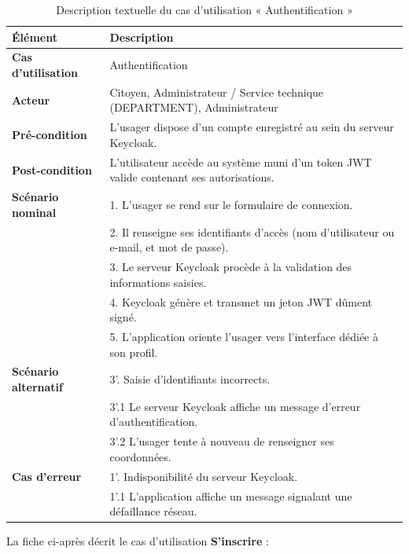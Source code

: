 \begin{table}[H]
    \centering
    \caption{Description textuelle du cas d'utilisation « Authentification »}
    \label{tab:txt_auth}
    \vspace{0.2cm}
    \small
    \begin{tabularx}{\textwidth}{|l|X|}
        \hline
        \textbf{Élément} & \textbf{Description} \\ \hline
        \textbf{Cas d’utilisation} & Authentification \\ \hline
        \textbf{Acteur} & Citoyen, Administrateur / Service technique (DEPARTMENT), Administrateur \\ \hline
        \textbf{Pré-condition} & L'usager dispose d'un compte enregistré au sein du serveur Keycloak. \\ \hline
        \textbf{Post-condition} & L'utilisateur accède au système muni d'un token JWT valide contenant ses autorisations. \\ \hline
        \textbf{Scénario nominal} & 
        1. L'usager se rend sur le formulaire de connexion.\\
        & 2. Il renseigne ses identifiants d'accès (nom d'utilisateur ou e-mail, et mot de passe).\\
        & 3. Le serveur Keycloak procède à la validation des informations saisies.\\
        & 4. Keycloak génère et transmet un jeton JWT dûment signé.\\
        & 5. L'application oriente l'usager vers l'interface dédiée à son profil. \\ \hline
        \textbf{Scénario alternatif} &
        3'. Saisie d'identifiants incorrects.\\
        & 3'.1 Le serveur Keycloak affiche un message d'erreur d'authentification.\\
        & 3'.2 L'usager tente à nouveau de renseigner ses coordonnées. \\ \hline
        \textbf{Cas d’erreur} &
        1'. Indisponibilité du serveur Keycloak.\\
        & 1'.1 L'application affiche un message signalant une défaillance réseau. \\ \hline
    \end{tabularx}
\end{table}

La fiche ci-après décrit le cas d'utilisation \textbf{\og S'inscrire \fg{}} :

